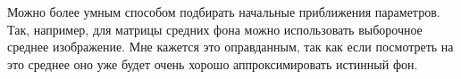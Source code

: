 Можно более умным способом подбирать начальные приближения параметров. Так, например, для матрицы средних фона можно использовать выборочное среднее изображение. Мне кажется это оправданным, так как если посмотреть на это среднее оно уже будет очень хорошо аппроксимировать истинный фон.